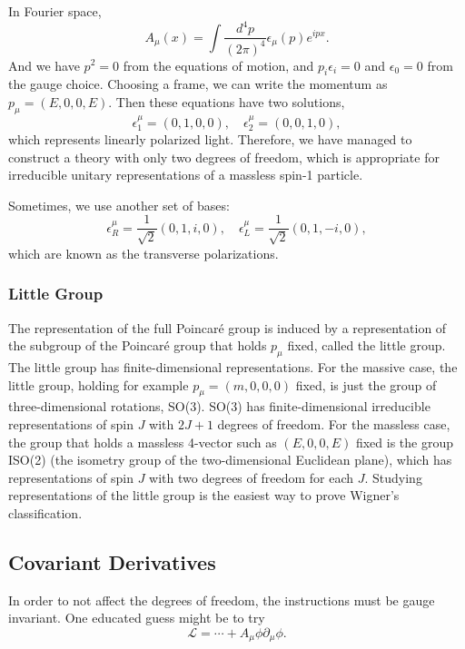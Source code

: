 \documentclass[11pt]{article}
\theoremstyle{definition}
\begin{document}
In Fourier space, 
\begin{equation}
    A_\mu(x) = \int \frac{d^4p}{(2\pi)^4}\epsilon_\mu(p)e^{ipx}.
\end{equation}
And we have $p^2=0$ from the equations of motion, and $p_i\epsilon_i = 0$ and $\epsilon_0 = 0$ from the gauge choice. Choosing a frame, we can write the momentum as $p_\mu= (E, 0, 0, E)$. Then these equations have two solutions,
\begin{equation}
    \epsilon^\mu_1  = (0, 1, 0, 0), \quad \epsilon^\mu_2  = (0, 0, 1, 0),
\end{equation}
which represents linearly polarized light. Therefore, we have managed to construct a theory with only two degrees of freedom, which is appropriate for irreducible unitary representations of a massless spin-1 particle.

Sometimes, we use another set of bases:
\begin{equation}
    \epsilon^\mu_R = \frac{1}{\sqrt{2}}(0, 1, i,0), \quad \epsilon^\mu_L = \frac{1}{\sqrt{2}}(0, 1, -i,0),
\end{equation}
which are known as the transverse polarizations.

\subsubsection{Little Group}
The representation of the full Poincaré group is induced by a representation of the subgroup of the Poincaré group that holds $p_\mu$ fixed, called the little group. The little group has finite-dimensional representations. For the massive case, the little group, holding for example $p_\mu = (m,0,0,0)$ fixed, is just the group of three-dimensional rotations, SO(3). SO(3) has finite-dimensional irreducible representations of spin $J$ with $2J+1$ degrees of freedom. For the massless case, the group that holds a massless 4-vector such as $(E, 0, 0, E)$ fixed is the group ISO(2) (the isometry group of the two-dimensional Euclidean plane), which has representations of spin $J$ with two degrees of freedom for each $J$. Studying representations of the little group is the easiest way to prove Wigner's classification.

\subsection{Covariant Derivatives}
In order to not affect the degrees of freedom, the instructions must be gauge invariant. One educated guess might be to try
\begin{equation}
    \mathcal{L} = \cdots + A_\mu \phi\partial_\mu\phi.
\end{equation}
\end{document}
